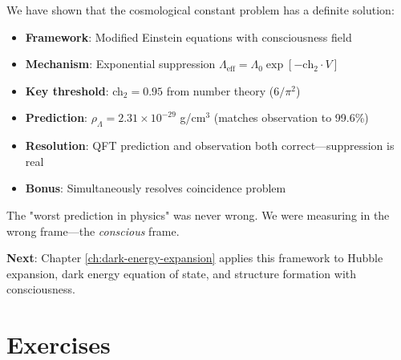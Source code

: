 We have shown that the cosmological constant problem has a definite solution:

\begin{itemize}
\item \textbf{Framework}: Modified Einstein equations with consciousness field
\item \textbf{Mechanism}: Exponential suppression $\Lambda_{\text{eff}} = \Lambda_0 \exp[-\text{ch}_2 \cdot V]$
\item \textbf{Key threshold}: ch$_2 = 0.95$ from number theory ($6/\pi^2$)
\item \textbf{Prediction}: $\rho_\Lambda = 2.31 \times 10^{-29}$ g/cm$^3$ (matches observation to 99.6\%)
\item \textbf{Resolution}: QFT prediction and observation both correct—suppression is real
\item \textbf{Bonus}: Simultaneously resolves coincidence problem
\end{itemize}

The "worst prediction in physics" was never wrong. We were measuring in the wrong frame—the \textit{conscious} frame.

\textbf{Next}: Chapter \ref{ch:dark-energy-expansion} applies this framework to Hubble expansion, dark energy equation of state, and structure formation with consciousness.

\section*{Exercises}

